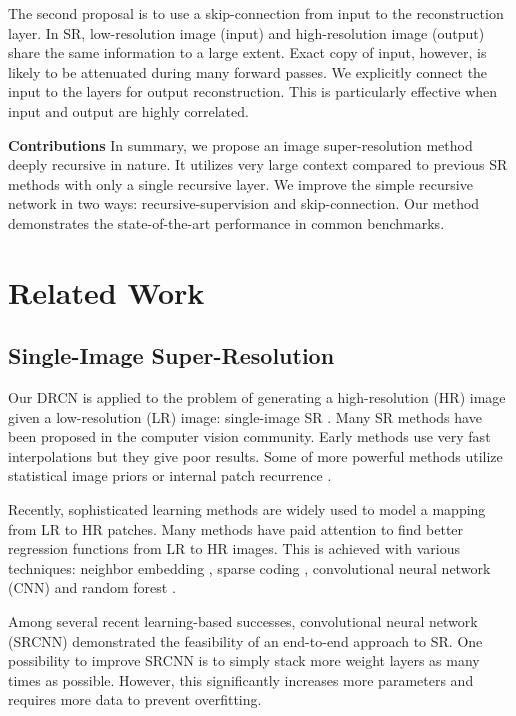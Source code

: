 \documentclass[10pt,twocolumn,letterpaper]{article}
\begin{document}
The second proposal is to use a skip-connection from input to the reconstruction layer. In SR, low-resolution image (input) and high-resolution image (output) share the same information to a large extent. Exact copy of input, however, is likely to be attenuated during many forward passes. We explicitly connect the input to the layers for output reconstruction. This is particularly effective when input and output are highly correlated.

\textbf{Contributions} In summary, we propose an image super-resolution method deeply recursive in nature. It utilizes very large context compared to previous SR methods with only a single recursive layer. We improve the simple recursive network in two ways: recursive-supervision and skip-connection. Our method demonstrates the state-of-the-art performance in common benchmarks.

\section{Related Work}

\subsection{Single-Image Super-Resolution}

Our DRCN is applied to the problem of generating a high-resolution (HR) image given a low-resolution (LR) image: single-image SR \cite{Irani1991, freeman2000learning,glasner2009super}. Many SR methods have been proposed in the computer vision community. Early methods use very fast interpolations but they give poor results. Some of more powerful methods utilize statistical image priors \cite{sun2008image,Kim2010} or internal patch recurrence \cite{glasner2009super, Huang-CVPR-2015}.

Recently, sophisticated learning methods are widely used to model a mapping from LR to HR patches. Many methods have paid attention to find better regression functions from LR to HR images. This is achieved with various techniques: neighbor embedding \cite{chang2004super,bevilacqua2012}, sparse coding \cite{yang2010image,zeyde2012single,Timofte2013,Timofte}, convolutional neural network (CNN) \cite{dong2014image} and random forest \cite{schulter2015fast}.

Among several recent learning-based successes,  convolutional neural network (SRCNN) \cite{dong2014image} demonstrated the feasibility of an end-to-end approach to SR. One possibility to improve SRCNN is to simply stack more weight layers as many times as possible. However, this significantly increases more parameters and requires more data to prevent overfitting.  
\end{document}
